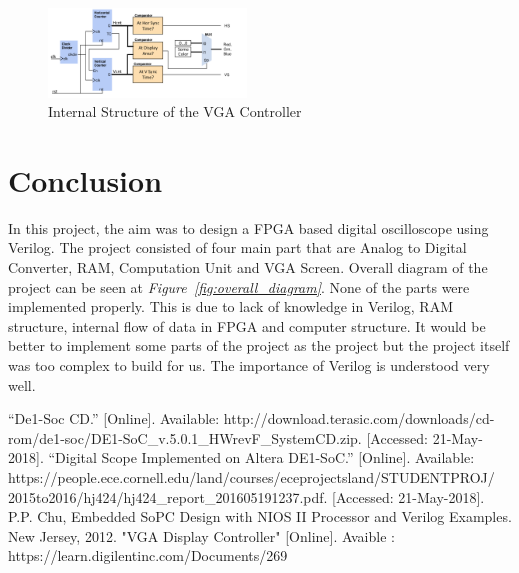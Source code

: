 \documentclass[paper]{IEEEtran}
\begin{document}
	\begin{figure}[h!]
		\setlength{\unitlength}{\textwidth}
		\center 
		\includegraphics[width=0.47\textwidth]{vgacontroller}
		\caption{\label{fig:vgacontroller} Internal Structure of the VGA Controller}
	\end{figure}
	
	
	\section{Conclusion}
	\- \indent
	In this project, the aim was to design a FPGA based digital oscilloscope using Verilog. The project consisted of four main part that are Analog to Digital Converter, RAM, Computation Unit and VGA Screen. Overall diagram of the project can be seen at \textit{Figure~\ref{fig:overall_diagram}}. None of the parts were implemented properly. This is due to lack of knowledge in Verilog, RAM structure, internal flow of data in FPGA and computer structure. It would be better to implement some parts of the project as the project but the project itself was too complex to build for us. The importance of Verilog is understood very well.
	
	
	
	\begin{thebibliography}{00}
		 “De1-Soc CD.” [Online]. Available: http://download.terasic.com/downloads/cd-rom/de1-soc/DE1-SoC\_v.5.0.1\_HWrevF\_SystemCD.zip. [Accessed: 21-May-2018].
		 “Digital Scope Implemented on Altera DE1-SoC.” [Online]. Available: https://people.ece.cornell.edu/land/courses/eceprojectsland/STUDENTPROJ/\\2015to2016/hj424/hj424\_report\_201605191237.pdf. [Accessed: 21-May-2018].
		 P.P. Chu, Embedded SoPC Design with NIOS II Processor and Verilog Examples. New Jersey, 2012.
		 "VGA Display Controller" [Online]. Avaible : https://learn.digilentinc.com/Documents/269
	\end{thebibliography}
	
	
	
	
\end{document}

